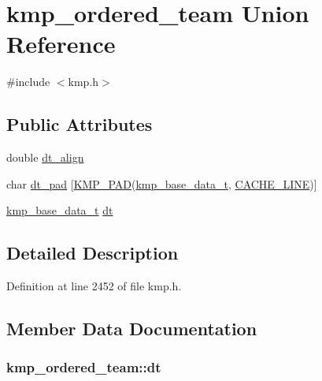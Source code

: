\hypertarget{unionkmp__ordered__team}{\section{kmp\-\_\-ordered\-\_\-team Union Reference}
\label{unionkmp__ordered__team}
}


{\ttfamily \#include $<$kmp.\-h$>$}

\subsection*{Public Attributes}
\begin{DoxyCompactItemize}
\item 
double \hyperlink{unionkmp__ordered__team_a5ca8af67bc2e01e55f8bbebd1bc0541a}{dt\-\_\-align}
\item 
char \hyperlink{unionkmp__ordered__team_a9c4afa12f92bb1ceab0c47e9c8193df8}{dt\-\_\-pad} \mbox{[}\hyperlink{kmp__lock_8h_a7e782410115489f45ab1686c39a2bb89}{K\-M\-P\-\_\-\-P\-A\-D}(\hyperlink{kmp_8h_a70eaeca396fffda9b8844afc81efa073}{kmp\-\_\-base\-\_\-data\-\_\-t}, \hyperlink{kmp__os_8h_a86194c659a2d795e5f5949d293ae4661}{C\-A\-C\-H\-E\-\_\-\-L\-I\-N\-E})\mbox{]}
\item 
\hyperlink{kmp_8h_a70eaeca396fffda9b8844afc81efa073}{kmp\-\_\-base\-\_\-data\-\_\-t} \hyperlink{unionkmp__ordered__team_aef47b96fd134d622f1e888e780c2f24e}{dt}
\end{DoxyCompactItemize}


\subsection{Detailed Description}


Definition at line 2452 of file kmp.\-h.



\subsection{Member Data Documentation}
\hypertarget{unionkmp__ordered__team_aef47b96fd134d622f1e888e780c2f24e}{
\subsubsection[{dt}]{ kmp\-\_\-ordered\-\_\-team\-::dt}}\label{unionkmp__ordered__team_aef47b96fd134d622f1e888e780c2f24e}


